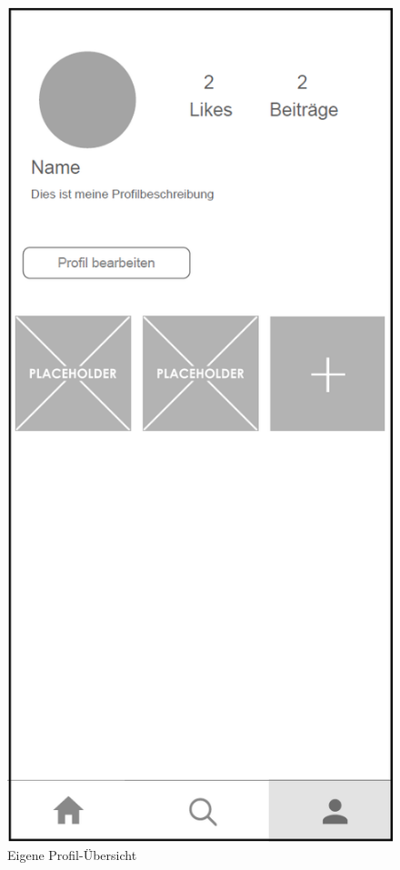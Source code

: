 \begin{figure}[H]
    \centering
    \begin{minipage}{.5\textwidth}
      \centering
      \includegraphics[width=.8\linewidth]{images/Profil_MockUp.png}
      \caption{Eigene Profil-Übersicht}
      \label{fig:own_profile}
    \end{minipage}%
    \begin{minipage}{.5\textwidth}
      \centering

\end{minipage}
\end{figure}

